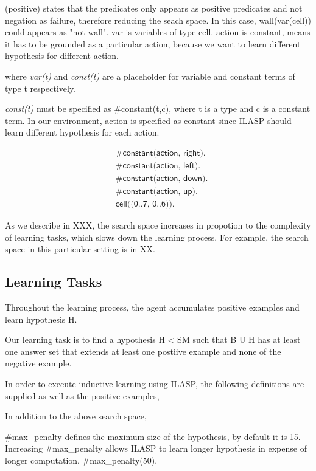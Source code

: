 (positive) states that the predicates only appears as positive predicates and not negation as failure, therefore reducing the seach space. In this case, wall(var(cell)) could appears as "not wall". 
var is variables of type cell. 
action is constant, means it has to be grounded as a particular action, because we want to learn different hypothesis for different action. 

where \textit{var(t)} and \textit{const(t)} are a placeholder for variable and constant terms of type t respectively.

\textit{const(t)} must be specified as \#constant(t,c), where t is a type and c is a constant term.
In our environment, action is specified as constant since ILASP should learn different hypothesis for each action.

\begin{equation}
\begin{split}
&\textsf{\#constant(action, right).}\\
&\textsf{\#constant(action, left).}\\
&\textsf{\#constant(action, down).}\\
&\textsf{\#constant(action, up).}\\
&\textsf{cell((0..7, 0..6)).}
\end{split}
\end{equation}

As we describe in XXX, the search space increases in propotion to the complexity of learning tasks, which slows down the learning process.
For example, the search space in this particular setting is in XX.

\subsection{Learning Tasks}
\label{sebsec:learning_tasks}
Throughout the learning process, the agent accumulates positive examples and learn hypothesis H.

Our learning task is to find a hypothesis H < SM such that B U H has at least one answer set that extends at least one postiive example and none of the negative example.

In order to execute inductive learning using ILASP, the following definitions are supplied as well as the positive examples,

In addition to the above search space, 

\#max\_penalty defines the maximum size of the hypothesis, by default it is 15.
Increasing \#max\_penalty allows ILASP to learn longer hypothesis in expense of longer computation.
\#max\_penalty(50).

